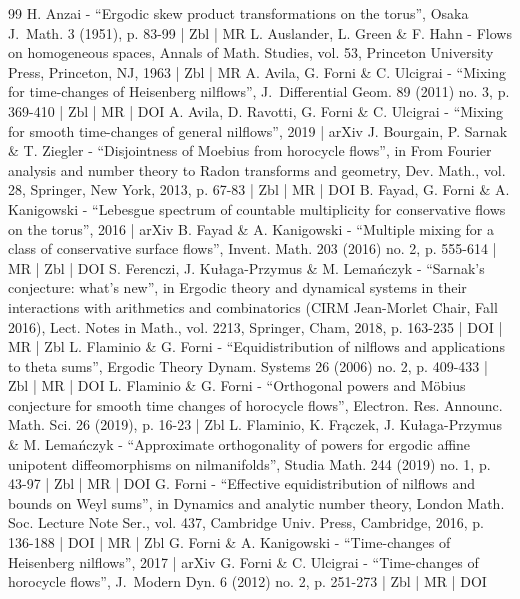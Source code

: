 \documentclass[10pt]{amsart}
\theoremstyle{definition}
\theoremstyle{plain}
\begin{document}
\begin{thebibliography}{99}
H. Anzai - “Ergodic skew product transformations on the torus”, Osaka J. Math. 3 (1951), p. 83-99 | Zbl | MR
L. Auslander, L. Green \& F. Hahn - Flows on homogeneous spaces, Annals of Math. Studies, vol. 53, Princeton University Press, Princeton, NJ, 1963 | Zbl | MR
A. Avila, G. Forni \& C. Ulcigrai - “Mixing for time-changes of Heisenberg nilflows”, J. Differential Geom. 89 (2011) no. 3, p. 369-410 | Zbl | MR | DOI
A. Avila, D. Ravotti, G. Forni \& C. Ulcigrai - “Mixing for smooth time-changes of general nilflows”, 2019 | arXiv
J. Bourgain, P. Sarnak \& T. Ziegler - “Disjointness of Moebius from horocycle flows”, in From Fourier analysis and number theory to Radon transforms and geometry, Dev. Math., vol. 28, Springer, New York, 2013, p. 67-83 | Zbl | MR | DOI
B. Fayad, G. Forni \& A. Kanigowski - “Lebesgue spectrum of countable multiplicity for conservative flows on the torus”, 2016 | arXiv
B. Fayad \& A. Kanigowski - “Multiple mixing for a class of conservative surface flows”, Invent. Math. 203 (2016) no. 2, p. 555-614 | MR | Zbl | DOI
S. Ferenczi, J. Kułaga-Przymus \& M. Lemańczyk - “Sarnak’s conjecture: what’s new”, in Ergodic theory and dynamical systems in their interactions with arithmetics and combinatorics (CIRM Jean-Morlet Chair, Fall 2016), Lect. Notes in Math., vol. 2213, Springer, Cham, 2018, p. 163-235 | DOI | MR | Zbl
L. Flaminio \& G. Forni - “Equidistribution of nilflows and applications to theta sums”, Ergodic Theory Dynam. Systems 26 (2006) no. 2, p. 409-433 | Zbl | MR | DOI
L. Flaminio \& G. Forni - “Orthogonal powers and Möbius conjecture for smooth time changes of horocycle flows”, Electron. Res. Announc. Math. Sci. 26 (2019), p. 16-23 | Zbl
L. Flaminio, K. Frączek, J. Kułaga-Przymus \& M. Lemańczyk - “Approximate orthogonality of powers for ergodic affine unipotent diffeomorphisms on nilmanifolds”, Studia Math. 244 (2019) no. 1, p. 43-97 | Zbl | MR | DOI
G. Forni - “Effective equidistribution of nilflows and bounds on Weyl sums”, in Dynamics and analytic number theory, London Math. Soc. Lecture Note Ser., vol. 437, Cambridge Univ. Press, Cambridge, 2016, p. 136-188 | DOI | MR | Zbl
G. Forni \& A. Kanigowski - “Time-changes of Heisenberg nilflows”, 2017 | arXiv
G. Forni \& C. Ulcigrai - “Time-changes of horocycle flows”, J. Modern Dyn. 6 (2012) no. 2, p. 251-273 | Zbl | MR | DOI

\end{thebibliography}
\end{document}
